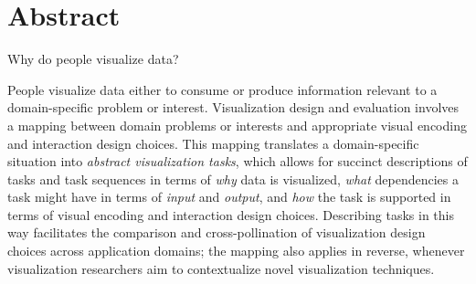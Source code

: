 
\chapter{Abstract}

Why do people visualize data?

People visualize data either to consume or produce information relevant to a domain-specific problem or interest.
Visualization design and evaluation involves a mapping between domain problems or interests and appropriate visual encoding and interaction design choices.
This mapping translates a domain-specific situation into \textsl{abstract visualization tasks}, which allows for succinct descriptions of tasks and task sequences in terms of {\it why} data is visualized, {\it what} dependencies a task might have in terms of {\it input} and {\it output}, and {\it how} the task is supported in terms of visual encoding and interaction design choices.
Describing tasks in this way facilitates the comparison and cross-pollination of visualization design choices across application domains; the mapping also applies in reverse, whenever visualization researchers aim to contextualize novel visualization techniques.

